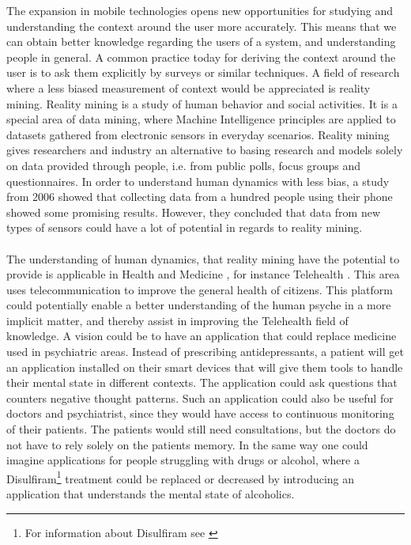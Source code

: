 
The expansion in mobile technologies opens new opportunities for studying and understanding the context around the user more accurately. This means that we can obtain better knowledge regarding the users of a system, and understanding people in general. A common practice today for deriving the context around the user is to ask them explicitly by surveys or similar techniques. A field of research where a less biased measurement of context would be appreciated is reality mining. Reality mining is a study of human behavior and social activities. It is a special area of data mining, where Machine Intelligence principles are applied to datasets gathered from electronic sensors in everyday scenarios. Reality mining gives researchers and industry an alternative to basing research and models solely on data provided through people, i.e. from public polls, focus groups and questionnaires. In order to understand human dynamics with less bias, a study from 2006 \parencite{eagle2006_reality_mining_definition} showed that collecting data from a hundred people using their phone showed some promising results. However, they concluded that data from new types of sensors could have a lot of potential in regards to reality mining. 
\\\\
The understanding of human dynamics, that reality mining have the potential to provide is applicable in Health and Medicine \parencite{pentland2009_reality_mining_health_medicine}, for instance Telehealth \parencite{telehealth_aau}. This area uses telecommunication to improve the general health of citizens. This platform could potentially enable a better understanding of the human psyche in a more implicit matter, and thereby assist in improving the Telehealth field of knowledge. A vision could be to have an application that could replace medicine used in psychiatric areas. Instead of prescribing antidepressants, a patient will get an application installed on their smart devices that will give them tools to handle their mental state in different contexts. The application could ask questions that counters negative thought patterns. Such an application could also be useful for doctors and psychiatrist, since they would have access to continuous monitoring of their patients. The patients would still need consultations, but the doctors do not have to rely solely on the patients memory. In the same way one could imagine applications for people struggling with drugs or alcohol, where a Disulfiram\footnote{For information about Disulfiram see \textcite{nlm_disulfiram}} treatment could be replaced or decreased by introducing an application that understands the mental state of alcoholics.
